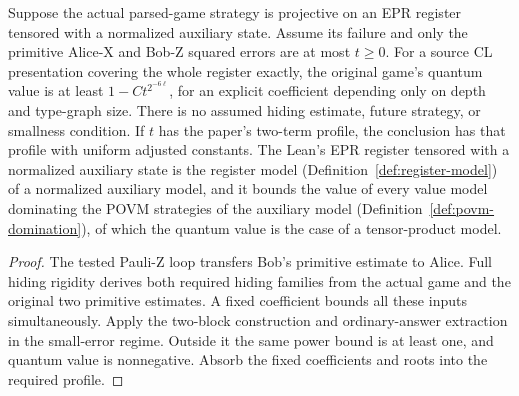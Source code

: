 \begin{lemma}
\label{lem:intro-primitive-soundness}
\leanok
Suppose the actual parsed-game strategy is projective on an EPR register
tensored with a normalized auxiliary state. Assume its failure and only
the primitive Alice-X and Bob-Z squared errors are at most $t\geq0$.
For a source CL presentation covering the whole register exactly, the
original game's quantum value is at least $1-Ct^{2^{-6\ell}}$, for an
explicit coefficient depending only on depth and type-graph size.
There is no assumed hiding estimate, future strategy, or smallness condition.
If $t$ has the paper's two-term profile, the conclusion has that profile
with uniform adjusted constants.
The Lean's EPR register tensored with a normalized auxiliary state is the register model
(Definition~\ref{def:register-model}) of a normalized auxiliary model, and it bounds the value of
every value model dominating the POVM strategies of the auxiliary model
(Definition~\ref{def:povm-domination}), of which the quantum value is the case of a tensor-product
model.
\end{lemma}
\begin{proof}
\leanok
The tested Pauli-Z loop transfers Bob's primitive estimate to Alice.
Full hiding rigidity derives both required hiding families from the actual
game and the original two primitive estimates. A fixed coefficient bounds
all these inputs simultaneously. Apply the two-block construction and
ordinary-answer extraction in the small-error regime. Outside it the same
power bound is at least one, and quantum value is nonnegative. Absorb the
fixed coefficients and roots into the required profile.
\end{proof}

